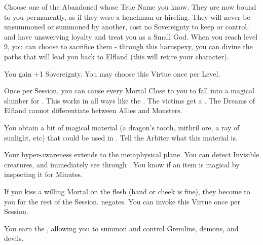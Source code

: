 \begin{multicols*}{2}




Choose one of the Abandoned whose True Name you know.  They are now bound to you permanently, as if they were a henchman or hireling. They will never be unsummoned or summoned by another, cost no Sovereignty to keep or control, and have unswerving loyalty and treat you as a Small God.  When you reach level 9, you can choose to sacrifice them - through this haruspexy, you can divine the paths that will lead you back to Elfland (this will retire your character).



You gain +1 Sovereignty.  You may choose this Virtue once per Level. 



Once per Session, you can cause every Mortal Close to you to fall into a magical slumber for .  This works in all ways like the . The victims get a .  The Dreams of Elfland cannot differentiate between Allies and Monsters.


You obtain a bit of magical material (a dragon's tooth, mithril ore, a ray of sunlight, etc) that could be used in .  Tell the Arbiter what this material is.


Your hyper-awareness extends to the metaphysical plane. You can detect Invisible creatures, and immediately see through . You know if an item is magical by inspecting it for Minutes.


If you kiss a willing Mortal on the flesh (hand or cheek is fine), they become  to you for the rest of the Session.  negates. You can invoke this Virtue once per Session.


You earn the , allowing you to summon and control Gremlins, demons, and devils.


\end{multicols*}
